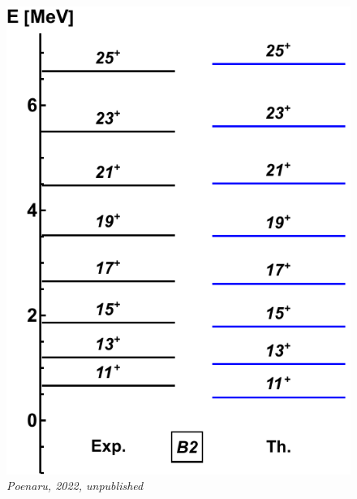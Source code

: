 \documentclass{beamer}
\begin{document}
\begin{frame}
\begin{columns}
\begin{column}{0.25\textwidth}
\begin{figure}
      \includegraphics[scale=0.285]{Figs/ba130-band2.pdf}
      \tiny{\emph{Poenaru, 2022, unpublished}}
    \end{figure}
  \end{column}
\end{columns}
\end{frame}
\end{document}

